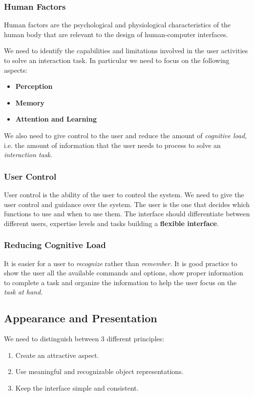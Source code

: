 \documentclass[11pt,a4paper]{article}
\theoremstyle{definition}
\theoremstyle{plain}
\theoremstyle{remark}
\begin{document}
\subsubsection{Human Factors}
Human factors are the psychological and physiological characteristics of the human body that are relevant to the design of human-computer interfaces.

We need to identify the capabilities and limitations involved in the user activities to solve an interaction task.
In particular we need to focus on the following aspects:
\begin{itemize}
    \item \textbf{Perception}
    \item \textbf{Memory}
    \item \textbf{Attention and Learning}
\end{itemize}
We also need to give control to the user and reduce the amount of \textit{cognitive load}, i.e. the amount of
 information that the user needs to process to solve an \textit{interaction task}.

\subsubsection{User Control}
User control is the ability of the user to control the system.
We need to give the user control and guidance over the system.
The user is the one that decides which functions to use and when to use them.
The interface should differentiate between different users, expertise levels and tasks building a \textbf{flexible interface}.
\subsubsection{Reducing Cognitive Load}
\begin{tcolorbox}[colback=cyan!5!white,colframe=cyan!75!black,title=\textbf{Recognition vs. Recall}]
It is easier for a user to \textit{recognize} rather than \textit{remember}.
It is good practice to show the user all the available commands and options, show proper information to complete a task and organize
the information to help the user focus on the \textit{task at hand}.
\end{tcolorbox}


\subsection{Appearance and Presentation}
We need to distinguish between 3 different principles:
\begin{enumerate}
    \item Create an attractive aspect.
    \item Use meaningful and recognizable object representations.
    \item Keep the interface simple and consistent.
\end{enumerate}
\end{document}
